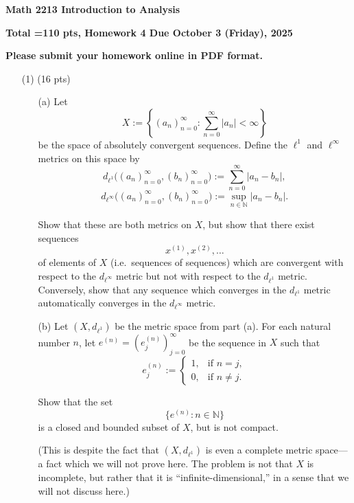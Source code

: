 \documentclass[12pt]{amsart}
\theoremstyle{definition}
\theoremstyle{remark}
\begin{document}
\begin{CJK}{UTF8}{bkai}

{\centerline{\bf Math 2213 Introduction to Analysis  }}

{\centerline{\bf Total =110 pts, Homework 4  Due  October 3 (Friday), 2025}}

{\centerline{\bf Please submit your homework online in PDF format.}}


 
\begin{enumerate}

\item[(1)]  (16 pts)  

  
  \begin{enumerate}
  \item[(a)] Let
\[
X := \left\{ (a_n)_{n=0}^\infty : \sum_{n=0}^\infty |a_n| < \infty \right\}
\]
be the space of absolutely convergent sequences. Define the $\ell^1$ and $\ell^\infty$ metrics on this space by
\[
d_{\ell^1}\big((a_n)_{n=0}^\infty,(b_n)_{n=0}^\infty\big)
:= \sum_{n=0}^\infty |a_n - b_n|,
\]
\[
d_{\ell^\infty}\big((a_n)_{n=0}^\infty,(b_n)_{n=0}^\infty\big)
:= \sup_{n\in\mathbb{N}} |a_n - b_n|.
\]

Show that these are both metrics on $X$, but show that there exist sequences 
\[
x^{(1)}, x^{(2)}, \dots
\]
of elements of $X$ (i.e.\ sequences of sequences) which are convergent with respect to the $d_{\ell^\infty}$ metric but not with respect to the $d_{\ell^1}$ metric. Conversely, show that any sequence which converges in the $d_{\ell^1}$ metric automatically converges in the $d_{\ell^\infty}$ metric.


 \item[(b)] Let $(X,d_{\ell^1})$ be the metric space from part (a).  
For each natural number $n$, let $e^{(n)} = (e^{(n)}_j)_{j=0}^\infty$ be the sequence in $X$ such that  
\[
e^{(n)}_j := 
\begin{cases}
1, & \text{if } n=j,\\
0, & \text{if } n\neq j.
\end{cases}
\]

Show that the set
\[
\{ e^{(n)} : n \in \mathbb{N} \}
\]
is a closed and bounded subset of $X$, but is not compact.  

(This is despite the fact that $(X,d_{\ell^1})$ is even a complete metric space---a fact which we will not prove here.  
The problem is not that $X$ is incomplete, but rather that it is ``infinite-dimensional,'' in a sense that we will not discuss here.)


\end{enumerate}
\end{enumerate}
\end{CJK}
\end{document}
